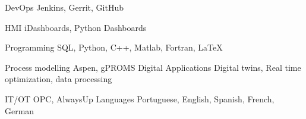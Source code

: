 

\begin{cvskills}

  \cvskill
    {DevOps} %
    {Jenkins, Gerrit, GitHub} %


  \cvskill
    {HMI} %
    {iDashboards, Python Dashboards} %

  \cvskill
    {Programming} %
    {SQL, Python, C++, Matlab, Fortran, LaTeX} %

  \cvskill
    {Process modelling} %
    {Aspen, gPROMS} %
  \cvskill
    {Digital Applications} %
    {Digital twins, Real time optimization, data processing} %

  \cvskill
    {IT/OT} %
    {OPC, AlwaysUp} %
  \cvskill
    {Languages} %
    {Portuguese, English, Spanish, French, German} %

\end{cvskills}
